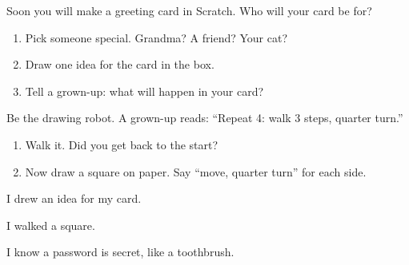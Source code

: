 
\begin{playathome}
Soon you will make a greeting card in Scratch. Who will your card be for?
\begin{enumerate}[leftmargin=1.4em,itemsep=2pt]
  \item Pick someone special. Grandma? A friend? Your cat?
  \item Draw one idea for the card in the box.
  \item Tell a grown-up: what will happen in your card?
\end{enumerate}
\answerspace{4cm}
\end{playathome}

\begin{playathome}
Be the drawing robot. A grown-up reads: \enquote{Repeat 4: walk 3 steps, quarter turn.}
\begin{enumerate}[leftmargin=1.4em,itemsep=2pt]
  \item Walk it. Did you get back to the start?
  \item Now draw a square on paper. Say \enquote{move, quarter turn} for each side.
\end{enumerate}
\end{playathome}

\begin{selfcheck}
  \item I drew an idea for my card.
  \item I walked a square.
  \item I know a password is secret, like a toothbrush.
\end{selfcheck}

